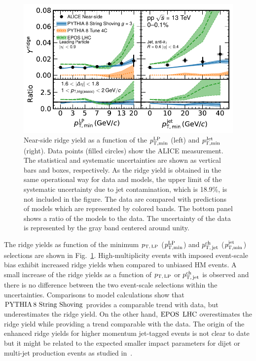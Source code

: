 
\begin{figure}[h!]
	\centering
	\includegraphics[width=0.89\linewidth]{./figures/Fig6_RidgeYieldESE.pdf}
	\caption{Near-side ridge yield as a function of the $\it{p}^{\rm{LP}}_{\rm{T,min}}$ (left) and $\it{p}^{\rm{Jet}}_{\rm{T,min}}$ (right). Data points (filled circles) show the ALICE measurement. The statistical and systematic uncertainties are shown as vertical bars and boxes, respectively. As the ridge yield is obtained in the same operational way for data and models, the upper limit of the systematic uncertainty due to jet contamination, which is 18.9\%, is not included in the figure. The data are compared with predictions of models which are represented by colored bands. The bottom panel shows a ratio of the models to the data. The uncertainty of the data is represented by the gray band centered around unity.}
	\label{fig:RidgeYield_ESE}
\end{figure}

The ridge yields as function of the minimum $p_\mathrm{T,\,LP}$ ($\it{p}^{\rm{LP}}_{\rm{T,min}}$) and $p_\mathrm{T,\,jet}^\mathrm{ch}$ ($\it{p}^{\rm{jet}}_{\rm{T,min}}$) selections are shown in Fig.~\ref{fig:RidgeYield_ESE}. High-multiplicity events with imposed event-scale bias exhibit increased ridge yields when compared to unbiased HM events. A small increase of the ridge yields as a function of $p_\mathrm{T,\,LP}$ or $p_\mathrm{T,\,jet}^\mathrm{ch}$ is observed and there is no difference between the two event-scale selections within the uncertainties. Comparisons to model calculations show that ${\mathrm{PYTHIA}\,8~\mathrm{String}~}\mathrm{Shoving}$ provides a comparable trend with data, but underestimates the ridge yield. On the other hand, ${\mathrm{EPOS}\,~\mathrm{LHC}}$ overestimates the ridge yield while providing a trend comparable with the data. The origin of the enhanced ridge yields for higher momentum jet-tagged events is not clear to date but it might be related to the expected smaller impact parameters for dijet or multi-jet production events as studied in~\cite{Frankfurt:2010ea}.

